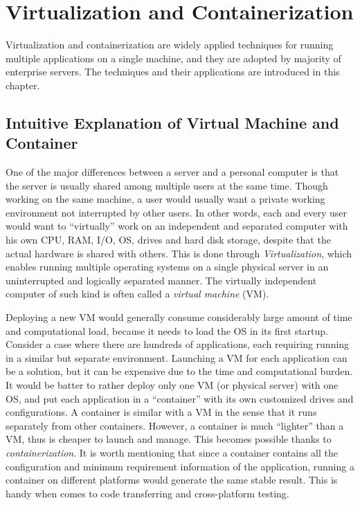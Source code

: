 \chapter{Virtualization and Containerization}

Virtualization and containerization are widely applied techniques for running multiple applications on a single machine, and they are adopted by majority of enterprise servers. The techniques and their applications are introduced in this chapter.

\section{Intuitive Explanation of Virtual Machine and Container}

One of the major differences between a server and a personal computer is that the server is usually shared among multiple users at the same time. Though working on the same machine, a user would usually want a private working environment not interrupted by other users. In other words, each and every user would want to ``virtually'' work on an independent and separated computer with his own CPU, RAM, I/O, OS, drives and hard disk storage, despite that the actual hardware is shared with others. This is done through \textit{Virtualization}, which enables running multiple operating systems on a single physical server in an uninterrupted and logically separated manner. The virtually independent computer of such kind is often called a \textit{virtual machine} (VM).

Deploying a new VM would generally consume considerably large amount of time and computational load, because it needs to load the OS in its first startup. Consider a case where there are hundreds of applications, each requiring running in a similar but separate environment. Launching a VM for each application can be a solution, but it can be expensive due to the time and computational burden. It would be batter to rather deploy only one VM (or physical server) with one OS, and put each application in a ``container'' with its own customized drives and configurations. A container is similar with a VM in the sense that it runs separately from other containers. However, a container is much ``lighter'' than a VM, thus is cheaper to launch and manage. This becomes possible thanks to \textit{containerization}. It is worth mentioning that since a container contains all the configuration and minimum requirement information of the application, running a container on different platforms would generate the same stable result. This is handy when comes to code transferring and cross-platform testing.

